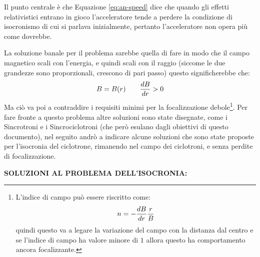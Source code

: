 \documentclass[a4paper,10pt]{article}
\begin{document}
Il punto centrale è che Equazione \ref{eq:an-speed} dice che quando gli effetti relativistici
entrano in gioco l'acceleratore tende a perdere la condizione di isocronismo di cui si parlava
inizialmente, pertanto l'acceleratore non opera più come dovrebbe.

La soluzione banale per il problema sarebbe quella di fare in modo che il campo magnetico scali con
l'energia, e quindi scali con il raggio (siccome le due grandezze sono proporzionali, crescono di
pari passo) questo significherebbe che:
\begin{equation}
	B = B(r) \qquad \frac{d B}{d r} > 0
\end{equation}
Ma ciò va poi a contraddire i requisiti minimi per la focalizzazione debole\footnote{L'indice di
	campo può essere riscritto come:
	\begin{equation}
		n = -\frac{d B}{d r}\frac{r}{B}
	\end{equation}
	quindi questo va a legare la variazione del campo con la distanza dal centro e se l'indice di campo
	ha valore minore di $1$ allora questo ha comportamento ancora focalizzante.
}\cite{cyclotrons}. Per fare fronte a questo problema altre soluzioni sono state disegnate, come i
Sincrotroni e i Sincrociclotroni (che però esulano dagli obiettivi di questo documento), nel seguito
andrò a indicare alcune soluzioni che sono state proposte per l'isocronia del ciclotrone, rimanendo
nel campo dei ciclotroni, e senza perdite di focalizzazione.

\bigskip
{}
\makeatletter{}\makeatother
\label{sec:future-cyclotron}
\noindent
\textbf{SOLUZIONI AL PROBLEMA DELL'ISOCRONIA:}
\\

\clearpage

\printbibliography
\end{document}

